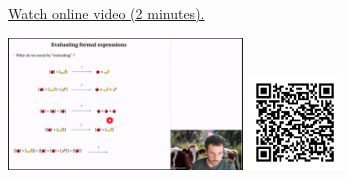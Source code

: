 
\begin{minipage}{10cm}
    \href{https://act4e-spring21.netlify.app/videos/spring2021-monads-b:eval-formal-expr.html}{Watch online video (2 minutes).}
        
    \href{https://act4e-spring21.netlify.app/videos/spring2021-monads-b:eval-formal-expr.html}{\includegraphics[height=3.5cm]{spring2021-monads-b:eval-formal-expr/thumbnails.jpg}}
    \href{https://act4e-spring21.netlify.app/videos/spring2021-monads-b:eval-formal-expr.html}{\includegraphics[height=2.5cm]{spring2021-monads-b:eval-formal-expr/qrcode.png}}
\end{minipage}
